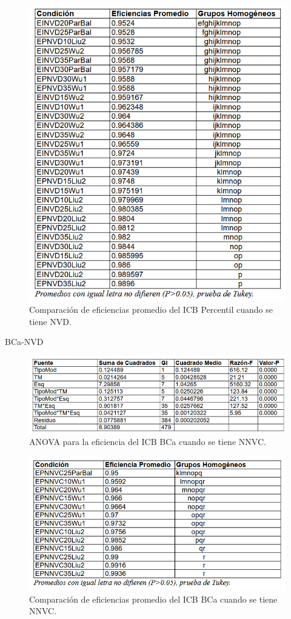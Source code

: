 \begin{figure}[ht] 
	\centering 
	\includegraphics[width=0.76\linewidth]{img/CompEfic_PromICB_Perc_NVD.png} 
	\caption{Comparación de eficiencias promedio del ICB Percentil cuando se tiene NVD.} 
	\label{fig:CompEfic_PromICB_Perc_NVD}
\end{figure}
\FloatBarrier



BCa-NVD

\begin{figure}[ht] 
	\centering 
	\includegraphics[width=0.95\linewidth]{img/ANOVA_Efic_ICB_BCa_NNVC.png} 
	\caption{ANOVA para la eficiencia del ICB BCa cuando se tiene NNVC.} 
	\label{fig:ANOVA_Efic_ICB_BCa_NNVC}
\end{figure}
\FloatBarrier


\begin{figure}[ht] 
	\centering 
	\includegraphics[width=0.76\linewidth]{img/CompEfic_PromICB_BCa_NNVC.png} 
	\caption{Comparación de eficiencias promedio del ICB BCa cuando se tiene NNVC.} 
	\label{fig:CompEfic_PromICB_BCa_NNVC}
\end{figure}
\FloatBarrier





